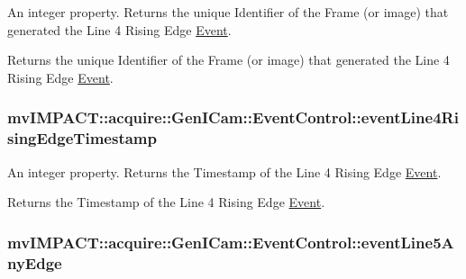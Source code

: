 An integer property. Returns the unique Identifier of the Frame (or image) that generated the Line 4 Rising Edge \hyperlink{classmv_i_m_p_a_c_t_1_1acquire_1_1_event}{Event}. 

Returns the unique Identifier of the Frame (or image) that generated the Line 4 Rising Edge \hyperlink{classmv_i_m_p_a_c_t_1_1acquire_1_1_event}{Event}. \hypertarget{classmv_i_m_p_a_c_t_1_1acquire_1_1_gen_i_cam_1_1_event_control_af6353485a730ba23dbc55d74a1f7e8f2}{
\subsubsection[{event\+Line4\+Rising\+Edge\+Timestamp}]{ mv\+I\+M\+P\+A\+C\+T\+::acquire\+::\+Gen\+I\+Cam\+::\+Event\+Control\+::event\+Line4\+Rising\+Edge\+Timestamp}}\label{classmv_i_m_p_a_c_t_1_1acquire_1_1_gen_i_cam_1_1_event_control_af6353485a730ba23dbc55d74a1f7e8f2}


An integer property. Returns the Timestamp of the Line 4 Rising Edge \hyperlink{classmv_i_m_p_a_c_t_1_1acquire_1_1_event}{Event}. 

Returns the Timestamp of the Line 4 Rising Edge \hyperlink{classmv_i_m_p_a_c_t_1_1acquire_1_1_event}{Event}. \hypertarget{classmv_i_m_p_a_c_t_1_1acquire_1_1_gen_i_cam_1_1_event_control_aed4f59ff460370876a91446f56a9e2d7}{
\subsubsection[{event\+Line5\+Any\+Edge}]{ mv\+I\+M\+P\+A\+C\+T\+::acquire\+::\+Gen\+I\+Cam\+::\+Event\+Control\+::event\+Line5\+Any\+Edge}}\label{classmv_i_m_p_a_c_t_1_1acquire_1_1_gen_i_cam_1_1_event_control_aed4f59ff460370876a91446f56a9e2d7}


